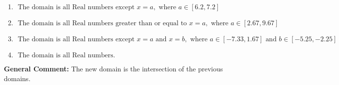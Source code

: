 \documentclass{extbook}[14pt]
\begin{document}
\begin{enumerate}
{\begin{enumerate}[label=\Alph*.]
\item \( \text{ The domain is all Real numbers except } x = a, \text{ where } a \in [6.2, 7.2] \)


\item \( \text{ The domain is all Real numbers greater than or equal to } x = a, \text{ where } a \in [2.67, 9.67] \)


\item \( \text{ The domain is all Real numbers except } x = a \text{ and } x = b, \text{ where } a \in [-7.33, 1.67] \text{ and } b \in [-5.25, -2.25] \)


\item \( \text{ The domain is all Real numbers. } \)


\end{enumerate}

\textbf{General Comment:} The new domain is the intersection of the previous domains.
}
\end{enumerate}
\end{document}
